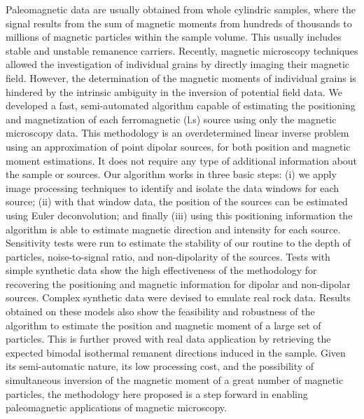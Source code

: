 Paleomagnetic data are usually obtained from whole cylindric samples, where the signal results from the sum of magnetic moments from hundreds of thousands to millions of magnetic particles within the sample volume. This usually includes stable and unstable remanence carriers. Recently, magnetic microscopy techniques allowed the investigation of individual grains by directly imaging their magnetic field. However, the determination of the magnetic moments of individual grains is hindered by the intrinsic ambiguity in the inversion of potential field data. We developed a fast, semi-automated algorithm capable of estimating the positioning and magnetization of each ferromagnetic (l.s) source using only the magnetic microscopy data. This methodology is an overdetermined linear inverse problem using an approximation of point dipolar sources, for both position and magnetic moment estimations. It does not require any type of additional information about the sample or sources. Our algorithm works in three basic steps: (i) we apply image processing techniques to identify and isolate the data windows for each source; (ii) with that window data, the position of the sources can be estimated using Euler deconvolution; and finally (iii) using this positioning information the algorithm is able to estimate magnetic direction and intensity for each source. Sensitivity tests were run to estimate the stability of our routine to the depth of particles, noise-to-signal ratio, and non-dipolarity of the sources. Tests with simple synthetic data show the high effectiveness of the methodology for recovering the positioning and magnetic information for dipolar and non-dipolar sources. Complex synthetic data were devised to emulate real rock data. Results obtained on these models also show the feasibility and robustness of the algorithm to estimate the position and magnetic moment of a large set of particles. This is further proved with real data application by retrieving the expected bimodal isothermal remanent directions induced in the sample. Given its semi-automatic nature, its low processing cost, and the possibility of simultaneous inversion of the magnetic moment of a great number of magnetic particles, the methodology here proposed is a step forward in enabling paleomagnetic applications of magnetic microscopy.